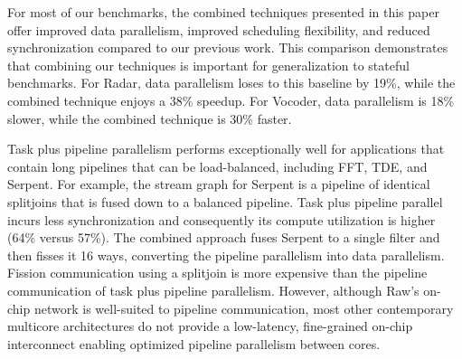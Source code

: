 For most of our benchmarks, the combined techniques presented in this
paper offer improved data parallelism, improved scheduling
flexibility, and reduced synchronization compared to our previous
work. This comparison demonstrates that combining our techniques is
important for generalization to stateful benchmarks.  For Radar, data
parallelism loses to this baseline by 19\%, while the combined
technique enjoys a 38\% speedup. For Vocoder, data parallelism is 18\%
slower, while the combined technique is 30\% faster.

Task plus pipeline parallelism performs exceptionally well for
applications that contain long pipelines that can be load-balanced,
including FFT, TDE, and Serpent.  For example, the stream graph for
Serpent is a pipeline of identical splitjoins that is fused down to a
balanced pipeline.  Task plus pipeline parallel incurs less
synchronization and consequently its compute utilization is higher
(64\% versus 57\%).  The combined approach fuses Serpent to a single
filter and then fisses it 16 ways, converting the pipeline parallelism
into data parallelism.  Fission communication using a splitjoin is
more expensive than the pipeline communication of task plus pipeline
parallelism.  However, although Raw's on-chip network is well-suited to
pipeline communication, most other contemporary multicore
architectures do not provide a low-latency, fine-grained on-chip
interconnect enabling optimized pipeline parallelism between cores.







